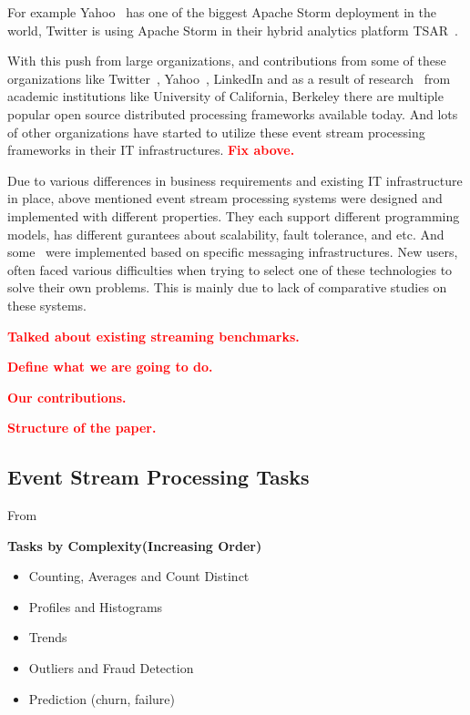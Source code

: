 \documentclass{sig-alternate}
\begin{document}
For example
Yahoo~\cite{hortonworks:2014:storm} has one of the biggest Apache Storm deployment in the
world, Twitter is using Apache Storm in their hybrid analytics
platform TSAR~\cite{twitter:2014:tsar}.

With this push from large organizations, and contributions from some
of these organizations like Twitter~\cite{toshniwal2014storm},
Yahoo~\cite{neumeyer2010s4}, LinkedIn and as a
result of research~\cite{zaharia2013discretized}
from academic institutions like University of California, Berkeley
there are multiple popular open source distributed processing frameworks
available today. And lots of other organizations have started to utilize
 these event stream processing frameworks in their IT infrastructures.
 \textcolor{Red}{\textbf{Fix above.}}

Due to various differences in business requirements and existing
IT infrastructure in place, above mentioned event stream processing
systems were designed and implemented with different properties. They
each support different programming models, has different gurantees about
 scalability, fault tolerance, and etc. And some~\cite{asf:2014:samza} were implemented based on
 specific messaging infrastructures. New users, often faced various difficulties
 when trying to select one of these technologies to solve their own problems.
 This is mainly due to lack of comparative studies on these systems.

 \textcolor{Red}{\textbf{Talked about existing streaming benchmarks.}}

 \textcolor{Red}{\textbf{Define what we are going to do.}}

 \textcolor{Red}{\textbf{Our contributions.}}

 \textcolor{Red}{\textbf{Structure of the paper.}}

 \subsection{Event Stream Processing Tasks}


From~\cite{streamdrill:presentation}

 \textbf{Tasks by Complexity(Increasing Order)}

 \begin{itemize}
  \item Counting, Averages and Count Distinct
  \item Profiles and Histograms
  \item Trends
  \item Outliers and Fraud Detection
  \item Prediction (churn, failure)
 \end{itemize}
\end{document}

